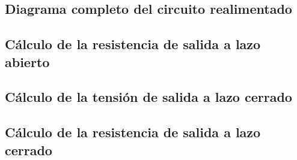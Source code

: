 \subsection{Diagrama completo del circuito realimentado}

\subsection{Cálculo de la resistencia de salida a lazo abierto}

\subsection{Cálculo de la tensión de salida a lazo cerrado}

\subsection{Cálculo de la resistencia de salida a lazo cerrado}

